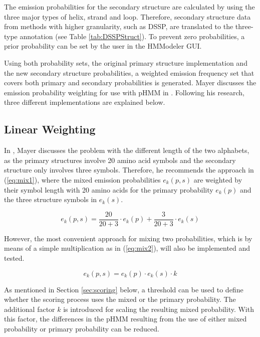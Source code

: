 The emission probabilities for the secondary structure are calculated by using the three major types of helix, strand and loop. Therefore, secondary structure data from methods with higher granularity, such as \ac{DSSP}, are translated to the three-type annotation (see Table \ref{tab:DSSPStruct}). 
  To prevent zero probabilities, a prior probability can be set by the user in the HMModeler \ac{GUI}.

Using both probability sets, the original primary structure implementation and the new secondary structure probabilities, a weighted emission frequency set that covers both primary and secondary probabilities is generated. 
Mayer discusses the emission probability weighting for use with \ac{pHMM} in \cite{Mayer.2014}. Following his research, three different implementations are explained below.

\subsection{Linear Weighting}

In \cite{Mayer.2014}, Mayer discusses the problem with the different length of the two alphabets, as the primary structures involve 20 amino acid symbols and the secondary structure only involves three symbols. Therefore, he recommends  the approach in  (\ref{eq:mix1}), where the mixed emission probabilities $e_k(p,s)$ are weighted by their symbol length with 20 amino acids for the primary probability $e_k(p)$ and the three structure symbols in $e_k(s)$.   

\begin{equation}
e_k(p,s) = \frac{20}{20+3}\cdot e_k(p) + \frac{3}{20+3} \cdot e_k (s)
\label{eq:mix1}
\end{equation}


However, the most convenient approach for mixing two probabilities, which is by means of a simple multiplication as in  (\ref{eq:mix2}), will also be implemented and tested. 

\begin{equation}
e_k(p,s) =  e_k(p) \cdot e_k (s) \cdot k
\label{eq:mix2}
\end{equation}

As mentioned in Section \ref{sec:scoring} below, a threshold can be used to define whether  the scoring process uses the mixed or the primary  probability. The additional factor $k$ is introduced for scaling the resulting mixed probability. 
With this factor, the differences in the \ac{pHMM} resulting from the use of either mixed probability or primary probability can be reduced.


